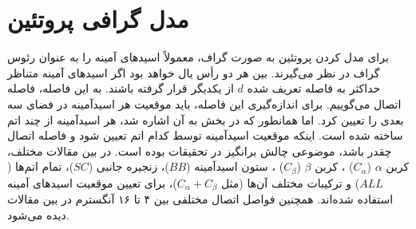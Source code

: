 \section{مدل گرافی پروتئین}
برای مدل کردن پروتئین به صورت گراف، معمولاً اسید‌های آمینه را به عنوان رئوس گراف در نظر می‌گیرند. بین هر دو رأس یال خواهد بود اگر اسیدهای آمینه متناظر حداکثر به فاصله تعریف شده $d$ از یکدیگر قرار گرفته باشند. به این فاصله، فاصله اتصال می‌گوییم. برای اندازه‌گیری این فاصله، باید موقعیت هر اسیدآمینه در فضای سه بعدی را تعیین کرد. اما همانطور که در بخش  به آن اشاره شد، هر اسیدآمینه از چند اتم ساخته شده است. اینکه موقعیت اسیدآمینه توسط کدام اتم تعیین شود و فاصله اتصال چقدر باشد، موضوعی چالش برانگیز در تحقیقات بوده است. در بین مقالات مختلف، کربن $\alpha$ 
($C_\alpha$)
، کربن $\beta$ 
($C_\beta$)
، ستون اسیدآمینه ($BB$)، زنجیره جانبی ($SC$)، تمام اتم‌ها ($ALL$) و ترکیبات مختلف آن‌ها (مثل $C_\alpha+C_\beta$)، برای تعیین موقعیت اسید‌های آمینه استفاده شده‌اند. همچنین فواصل اتصال مختلفی بین ۴ تا ۱۶ آنگسترم در بین مقالات دیده می‌شود.

